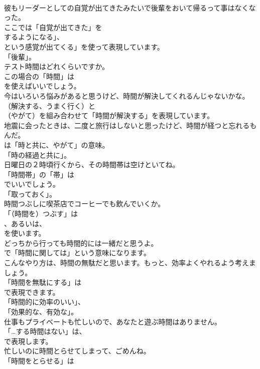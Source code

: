 \documentclass[8pt]{extreport}
\begin{document}
\begin{CJK}{UTF8}{min}
\\	彼もリーダーとしての自覚が出てきたみたいで後輩をおいて帰るって事はなくなった。 
\\	ここでは「自覚が出てきた」を
\\	するようになる」、
\\	という感覚が出てくる」を使って表現しています。
\\	「後輩」。	
\\	テスト時間はどれくらいですか。 
\\	この場合の「時間」は
\\	を使えばいいでしょう。	
\\	今はいろいろ悩みがあると思うけど、時間が解決してくれるんじゃないかな。 
\\	（解決する、うまく行く）と
\\	（やがて）を組み合わせて「時間が解決する」を表現しています。	
\\	地震に会ったときは、二度と旅行はしないと思ったけど、時間が経つと忘れるもんだ。 
\\	は「時と共に、やがて」の意味。
\\	「時の経過と共に」。	
\\	日曜日の２時頃行くから、その時間帯は空けといてね。 
\\	「時間帯」の「帯」は
\\	でいいでしょう。
\\	「取っておく」。	
\\	時間つぶしに喫茶店でコーヒーでも飲んでいくか。 
\\	「（時間を）つぶす」は
\\	、あるいは、
\\	を使います。	
\\	どっちから行っても時間的には一緒だと思うよ。 
\\	で「時間に関しては」という意味になります。	
\\	こんなやり方は、時間の無駄だと思います。もっと、効率よくやれるよう考えましょう。 
\\	「時間を無駄にする」は
\\	で表現できます。
\\	「時間的に効率のいい」、
\\	「効果的な、有効な」。	
\\	仕事もプライベートも忙しいので、あなたと遊ぶ時間はありません。 
\\	「…する時間はない」は、
\\	で表現します。	
\\	忙しいのに時間とらせてしまって、ごめんね。 
\\	「時間をとらせる」は

\end{CJK}
\end{document}
